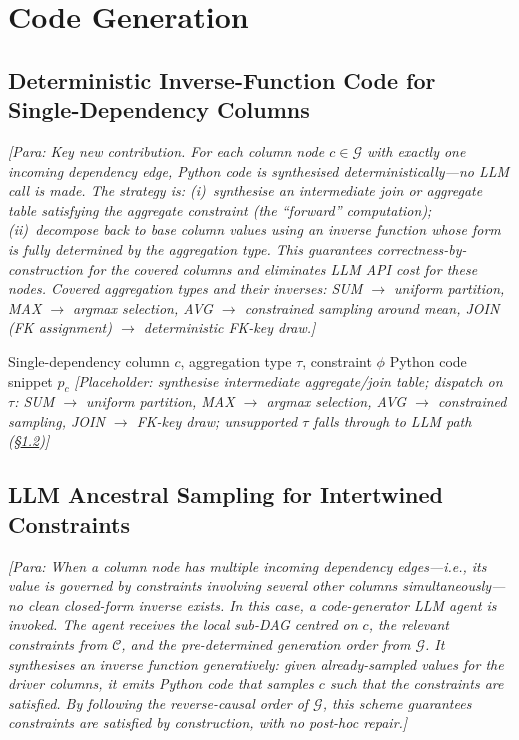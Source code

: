 \section{Code Generation}
\label{sec:stage4}

\subsection{Deterministic Inverse-Function Code for Single-Dependency Columns}
\label{subsec:det-codegen}
\textit{[Para: Key new contribution. For each column node $c \in \mathcal{G}$ with
\emph{exactly one} incoming dependency edge, Python code is synthesised
\emph{deterministically}---no LLM call is made.
The strategy is: (i)~synthesise an intermediate join or aggregate table satisfying the
aggregate constraint (the ``forward'' computation); (ii)~decompose back to base column
values using an inverse function whose form is fully determined by the aggregation type.
This guarantees correctness-by-construction for the covered columns and eliminates LLM API
cost for these nodes.
Covered aggregation types and their inverses: SUM $\to$ uniform partition,
MAX $\to$ argmax selection, AVG $\to$ constrained sampling around mean,
JOIN (FK assignment) $\to$ deterministic FK-key draw.]}

\begin{algorithm}[t]
\caption{Deterministic Inverse-Function Code Synthesis}
\label{alg:det-code}
\begin{algorithmic}[1]
  \Require Single-dependency column $c$, aggregation type $\tau$, constraint $\phi$
  \Ensure Python code snippet $p_c$
  \State \textit{[Placeholder: synthesise intermediate aggregate/join table;
         dispatch on $\tau$: SUM $\to$ uniform partition, MAX $\to$ argmax selection,
         AVG $\to$ constrained sampling, JOIN $\to$ FK-key draw;
         unsupported $\tau$ falls through to LLM path (§\ref{subsec:llm-sampling})]}
\end{algorithmic}
\end{algorithm}

\subsection{LLM Ancestral Sampling for Intertwined Constraints}
\label{subsec:llm-sampling}
\textit{[Para: When a column node has multiple incoming dependency edges---i.e., its value
is governed by constraints involving several other columns simultaneously---no clean
closed-form inverse exists.
In this case, a code-generator LLM agent is invoked.
The agent receives the local sub-DAG centred on $c$, the relevant constraints from
$\mathcal{C}$, and the pre-determined generation order from $\mathcal{G}$.
It synthesises an \emph{inverse function} generatively: given already-sampled values for
the driver columns, it emits Python code that samples $c$ such that the constraints
are satisfied.
By following the reverse-causal order of $\mathcal{G}$, this scheme guarantees
constraints are satisfied \emph{by construction}, with no post-hoc repair.]}

